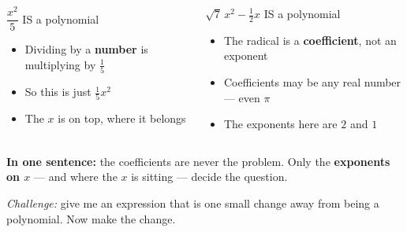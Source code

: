 \documentclass[aspectratio=169, 11pt]{beamer}
\begin{document}
\begin{frame}[t, plain]

  \begin{columns}[T]
      \begin{block}{$\dfrac{x^2}{5}$ \quad IS a polynomial}
        \begin{itemize}\setlength{\itemsep}{6pt}
          \item Dividing by a \textbf{number} is multiplying by $\frac{1}{5}$
          \item So this is just $\frac{1}{5}x^2$
          \item The $x$ is on top, where it belongs
        \end{itemize}
      \end{block}

      \begin{block}{$\sqrt{7}\,x^2 - \frac{1}{2}x$ \quad IS a polynomial}
        \begin{itemize}\setlength{\itemsep}{6pt}
          \item The radical is a \textbf{coefficient}, not an exponent
          \item Coefficients may be any real number --- even $\pi$
          \item The exponents here are $2$ and $1$
        \end{itemize}
      \end{block}
  \end{columns}

  \bigskip
  \textbf{In one sentence:} the coefficients are never the problem. Only the
  \textbf{exponents on $x$} --- and where the $x$ is sitting --- decide the question.

  \medskip
  \textit{Challenge:} give me an expression that is one small change away from being
  a polynomial. Now make the change.
\end{frame}
\end{document}

